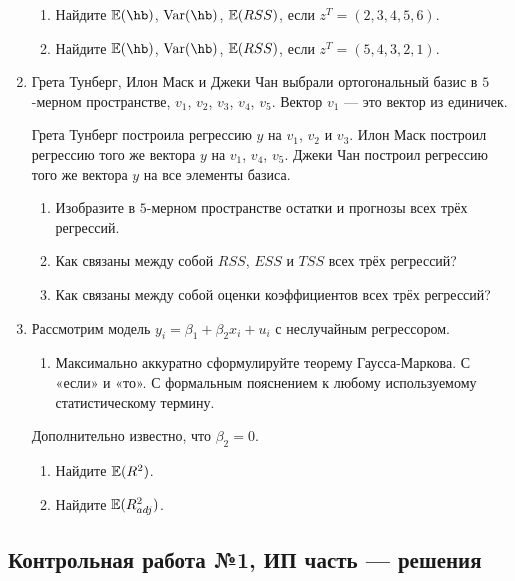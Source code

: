 \begin{enumerate}
\begin{enumerate}
\item Найдите $\E(\hb)$, $\Var(\hb)$, $\mathbb{E}(RSS)$, если $z^T = (2, 3, 4, 5, 6)$.
\item Найдите $\E(\hb)$, $\Var(\hb)$, $\mathbb{E}(RSS)$, если $z^T = (5, 4, 3, 2, 1)$.
\end{enumerate}

\item Грета Тунберг, Илон Маск и Джеки Чан выбрали ортогональный базис в $5$-мерном пространстве, 
$v_1$, $v_2$, $v_3$, $v_4$, $v_5$. Вектор $v_1$ — это вектор из единичек. 

Грета Тунберг построила регрессию $y$ на $v_1$, $v_2$ и $v_3$.
Илон Маск построил регрессию того же вектора $y$ на $v_1$, $v_4$, $v_5$.
Джеки Чан построил регрессию того же вектора $y$ на все элементы базиса.

\begin{enumerate}

\item Изобразите в $5$-мерном пространстве остатки и прогнозы всех трёх регрессий. 

\item Как связаны между собой $RSS$, $ESS$ и $TSS$ всех трёх регрессий?

\item Как связаны между собой оценки коэффициентов всех трёх регрессий?

\end{enumerate}

\item Рассмотрим модель $y_i = \beta_1 + \beta_2 x_i + u_i$ с неслучайным регрессором.

\begin{enumerate}
\item Максимально аккуратно сформулируйте теорему Гаусса-Маркова. С «если» и «то». 
С формальным пояснением к любому используемому статистическому термину. 
\end{enumerate}

Дополнительно известно, что $\beta_2 = 0$.
\begin{enumerate}[resume]
\item Найдите $\mathbb{E}(R^2)$.
\item Найдите $\mathbb{E}(R^2_{adj})$.
\end{enumerate}

\end{enumerate}



\subsection{Контрольная работа №1, ИП часть — решения}

